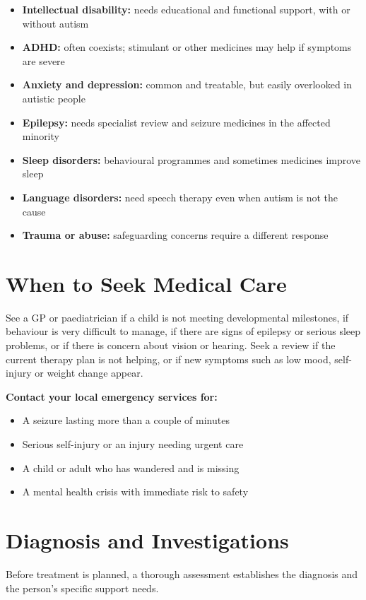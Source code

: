 \begin{itemize}
    \item \textbf{Intellectual disability:} needs educational and functional support, with or without autism
    \item \textbf{ADHD:} often coexists; stimulant or other medicines may help if symptoms are severe
    \item \textbf{Anxiety and depression:} common and treatable, but easily overlooked in autistic people
    \item \textbf{Epilepsy:} needs specialist review and seizure medicines in the affected minority
    \item \textbf{Sleep disorders:} behavioural programmes and sometimes medicines improve sleep
    \item \textbf{Language disorders:} need speech therapy even when autism is not the cause
    \item \textbf{Trauma or abuse:} safeguarding concerns require a different response
\end{itemize}

\section*{When to Seek Medical Care}
See a GP or paediatrician if a child is not meeting developmental milestones, if behaviour is very difficult to manage, if there are signs of epilepsy or serious sleep problems, or if there is concern about vision or hearing. Seek a review if the current therapy plan is not helping, or if new symptoms such as low mood, self-injury or weight change appear.

\textbf{Contact your local emergency services for:}
\begin{itemize}
    \item A seizure lasting more than a couple of minutes
    \item Serious self-injury or an injury needing urgent care
    \item A child or adult who has wandered and is missing
    \item A mental health crisis with immediate risk to safety
\end{itemize}

\section*{Diagnosis and Investigations}
Before treatment is planned, a thorough assessment establishes the diagnosis and the person's specific support needs.

